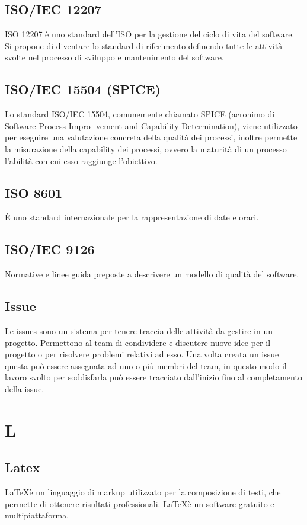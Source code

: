 \documentclass[11pt,a4paper]{article}
\begin{document}
		\subsection{ISO/IEC 12207}
		ISO 12207 è uno standard dell'ISO per la gestione del ciclo di vita del software. Si propone di diventare lo standard di riferimento definendo tutte le attività svolte nel processo di sviluppo e mantenimento del software.
	\subsection{ISO/IEC 15504 (SPICE)}
	Lo standard ISO/IEC 15504, comunemente chiamato SPICE (acronimo di Software Process Impro-
vement and Capability Determination), viene utilizzato per eseguire una valutazione concreta della
qualità dei processi, inoltre permette la misurazione della capability dei processi, ovvero la maturità
di un processo l’abilità con cui esso raggiunge l’obiettivo.

	\subsection{ISO 8601}
	È uno standard internazionale per la rappresentazione di date e orari.
	\subsection{ISO/IEC 9126}
	Normative e linee guida preposte a descrivere un modello di qualità del software.
	\subsection{Issue}
	Le issues sono un sistema per tenere traccia delle attività da gestire in un progetto. Permettono al team di condividere e discutere nuove idee per il progetto o per risolvere problemi relativi ad esso. Una volta creata un issue questa può essere assegnata ad uno o più membri del team, in questo modo il lavoro svolto per soddisfarla può essere tracciato dall'inizio fino al completamento della issue.
	\section{L}
	\subsection{Latex}
	\LaTeX è un linguaggio di markup utilizzato per la composizione di testi, che permette di ottenere risultati professionali. \LaTeX è un software gratuito e multipiattaforma.
\end{document}
